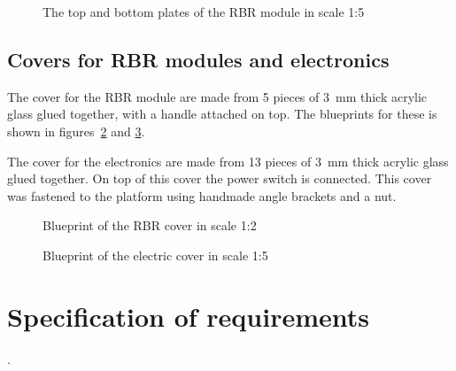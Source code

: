 \begin{figure}[htbp]
  \centering
  \caption{The top and bottom plates of the RBR module in scale 1:5}
  \label{fig:appendix-blueprint-rbr-module}
    
\end{figure}
\subsection{Covers for RBR modules and electronics}

The cover for the RBR module are made from 5 pieces of 3~mm thick acrylic glass
glued together, with a handle attached on top. The blueprints for these is shown in figures~\ref{fig:appendix-blueprint-rbr-cover} and \ref{fig:appendix-blueprint-electronic-cover}.

The cover for the electronics are made from 13 pieces of 3~mm thick acrylic glass
glued together. On top of this cover the power switch is connected. This cover
was fastened to the platform using handmade angle brackets and a nut.

\begin{figure}[htbp]
  \centering
  \caption{Blueprint of the RBR cover in scale 1:2}
  \label{fig:appendix-blueprint-rbr-cover}
    
\end{figure}
\begin{figure}[htbp]
  \centering
  \caption{Blueprint of the electric cover in scale 1:5}
  \label{fig:appendix-blueprint-electronic-cover}
    
\end{figure}
\section{Specification of requirements}
.
\label{kravspec}
